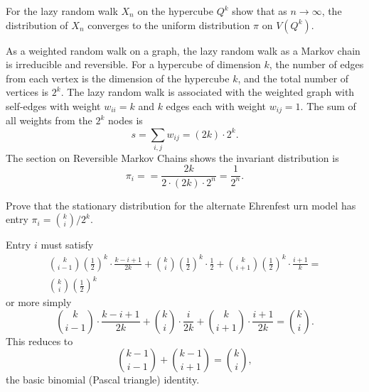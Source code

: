 \documentclass[12pt]{article}
\begin{document}
\begin{exercise}
    For the lazy random walk \( X_n \) on the hypercube \( Q^k \) show
    that as \( n \to \infty \), the distribution of \( X_n \) converges
    to the uniform distribution \( \pi \) on \( V(Q^k) \).
\end{exercise}
\begin{solution}
    As a weighted random walk on a graph, the lazy random walk as a
    Markov chain is irreducible and reversible.  For a hypercube of
    dimension \( k \), the number of edges from each vertex is the
    dimension of the hypercube \( k \), and the total number of vertices
    is \( 2^k \).  The lazy random walk is associated with the weighted
    graph with self-edges with weight \( w_{ii} = k \) and \( k \) edges
    each with weight \( w_{ij} = 1 \).  The sum of all weights from the \(
    2^k \) nodes is
    \[
        s = \sum_{i,j} w_{ij} = (2k) \cdot 2^{k}.
    \] The section on Reversible Markov Chains shows the invariant
    distribution is
    \[
        \pi_i = = \frac{2k}{2 \cdot (2k) \cdot 2^n} = \frac{1}{2^n}.
    \]
\end{solution}

\begin{exercise}
    Prove that the stationary distribution for the alternate Ehrenfest
    urn model has entry \( \pi_i = \binom{k}{i}/2^k \).
\end{exercise}

\begin{solution}
    Entry \( i \) must satisfy
    \begin{multline*}
        \binom{k}{i-1}\left( \frac{1}{2} \right)^k \cdot \frac{k-i+1}{2k}
        + \binom{k}{i}\left( \frac{1}{2} \right)^k \cdot \frac{1}{2} +
        \binom{k}{i+1}\left( \frac{1}{2} \right)^k \cdot \frac{i+1}{k} =
        \\
        \binom{k}{i}\left( \frac{1}{2} \right)^k
    \end{multline*}
    or more simply
    \[
        \binom{k}{i-1} \cdot \frac{k-i+1}{2k} + \binom{k}{i} \cdot \frac
        {i}{2k} + \binom{k}{i+1} \cdot \frac{i+1}{2k} = \binom{k}{i}.
    \] This reduces to
    \[
        \binom{k-1}{i-1} + \binom{k-1}{i+1} = \binom{k}{i},
    \] the basic binomial (Pascal triangle) identity.
\end{solution}
\end{document}
